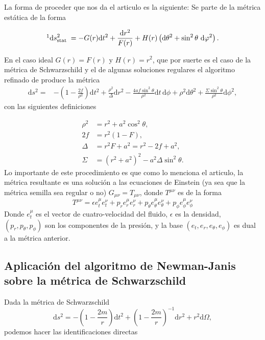 La forma de proceder que nos da el articulo es la siguiente:
Se parte de la métrica estática de la forma

\begin{equation}
\footnotemark \mathrm{d} s_{\text {stat }}^2 = - G(r) \mathrm{d} t^2+\frac{\mathrm{d} r^2}{F(r)}+H(r)\left(\mathrm{d} \theta^2+\sin ^2 \theta \mathrm{~d} \varphi^2\right).
\end{equation}

En el caso ideal $G(r)=F(r)$ y $H(r)=r^2$, que por suerte es el caso de la métrica de Schwarzschild y el de algunas soluciones regulares  el  algoritmo refinado de \cite{azreg-ainou-2014} produce la métrica
\begin{align}
\mathrm{d}s^2 = & 
- \left(1 - \frac{2f}{\rho^2}\right) \mathrm{d}t^2 
+ \frac{\rho^2}{\Delta} \mathrm{d}r^2 
- \frac{4af \sin^2\theta}{\rho^2} \mathrm{d}t\, \mathrm{d}\phi 
+ \rho^2 \mathrm{d}\theta^2 
+ \frac{\Sigma \sin^2\theta}{\rho^2} \mathrm{d}\phi^2,
\label{eq:metricGeneratedByNewmanJanis}
\end{align}
con las siguientes definiciones

\begin{align}
\rho^2 & =r^2+a^2 \cos ^2 \theta, \\
 2 f&=r^2(1-F), \\
\Delta & =r^2 F+a^2=r^2-2 f+a^2, \\
\Sigma & =\left(r^2+a^2\right)^2-a^2 \Delta \sin ^2 \theta .
\end{align}
Lo importante de este procedimiento es que como lo menciona el articulo, la métrica resultante es una solución a las ecuaciones de Einstein (ya sea que la métrica semilla sea regular o no) $G_{\mu \nu}=T_{\mu \nu}$, donde $T^{\mu \nu}$ es de la forma
\begin{equation}
T^{\mu \nu}=\epsilon e_t^\mu e_t^\nu+p_r e_r^\mu e_r^\nu+p_\theta e_\theta^\mu e_\theta^\nu+p_\phi e_\phi^\mu e_\phi^\nu
\end{equation}
Donde $e_t^\mu$ es el vector de cuatro-velocidad del fluido, $\epsilon$ es la densidad, $\left(p_r, p_\theta, p_\phi\right)$ son los componentes de la presión, y la base $\left(e_t, e_r, e_\theta, e_\phi\right)$ es dual a la métrica anterior.

\subsection{Aplicación del algoritmo de Newman-Janis sobre la métrica de Schwarzschild}
Dada la métrica de Schwarzschild
\begin{equation}
\mathrm{d} s^2=-\left(1-\frac{2 m}{r}\right) \mathrm{d} t^2+\left(1-\frac{2m}{r}\right)^{-1} \mathrm{d} r^2+r^2\mathrm{d} \Omega,
\end{equation}
podemos hacer las identificaciones directas

